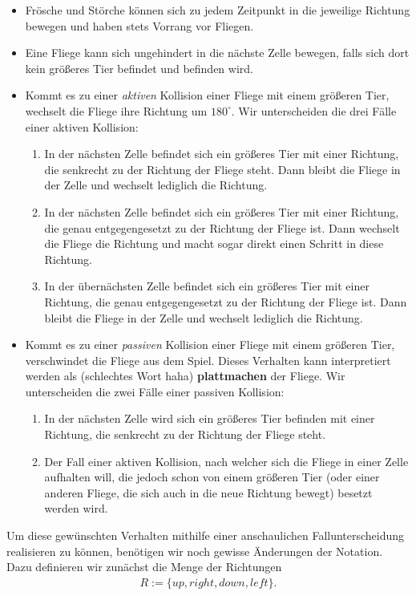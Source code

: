 \begin{itemize}
  \item Frösche und Störche können sich zu jedem Zeitpunkt in die jeweilige Richtung bewegen und haben stets Vorrang vor Fliegen.
  \item Eine Fliege kann sich ungehindert in die nächste Zelle bewegen, falls sich dort kein größeres Tier befindet und befinden wird.
  \item Kommt es zu einer \textit{aktiven} Kollision einer Fliege mit einem größeren Tier, wechselt die Fliege ihre Richtung um $180^{\circ}$. Wir unterscheiden die drei Fälle einer aktiven Kollision:
  \begin{enumerate}
    \item In der nächsten Zelle befindet sich ein größeres Tier mit einer Richtung, die senkrecht zu der Richtung der Fliege steht. Dann bleibt die Fliege in der Zelle und wechselt lediglich die Richtung.
    \item In der nächsten Zelle befindet sich ein größeres Tier mit einer Richtung, die genau entgegengesetzt zu der Richtung der Fliege ist. Dann wechselt die Fliege die Richtung und macht sogar direkt einen Schritt in diese Richtung.
    \item In der übernächsten Zelle befindet sich ein größeres Tier mit einer Richtung, die genau entgegengesetzt zu der Richtung der Fliege ist. Dann bleibt die Fliege in der Zelle und wechselt lediglich die Richtung.
  \end{enumerate}
  \item Kommt es zu einer \textit{passiven} Kollision einer Fliege mit einem größeren Tier, verschwindet die Fliege aus dem Spiel. Dieses Verhalten kann interpretiert werden als (schlechtes Wort haha) \textbf{plattmachen} der Fliege. Wir unterscheiden die zwei Fälle einer passiven Kollision:
  \begin{enumerate}
    \item In der nächsten Zelle wird sich ein größeres Tier befinden mit einer Richtung, die senkrecht zu der Richtung der Fliege steht.
    \item Der Fall einer aktiven Kollision, nach welcher sich die Fliege in einer Zelle aufhalten will, die jedoch schon von einem größeren Tier (oder einer anderen Fliege, die sich auch in die neue Richtung bewegt) besetzt werden wird.
  \end{enumerate}
\end{itemize}

Um diese gewünschten Verhalten mithilfe einer anschaulichen Fallunterscheidung realisieren zu können, benötigen wir noch gewisse Änderungen der Notation. Dazu definieren wir zunächst die Menge der Richtungen
\begin{align*}
  R := \{ up, right, down, left \}.
\end{align*}

